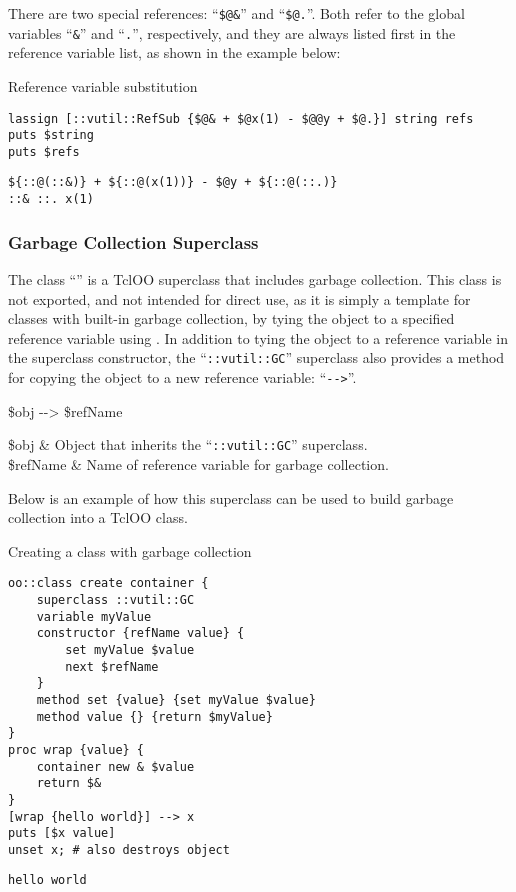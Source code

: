 \documentclass{article}
\begin{document}
There are two special references: ``\texttt{\$@\&}'' and ``\texttt{\$@.}''. Both refer to the global variables ``\texttt{\&}'' and ``\texttt{.}'', respectively, and they are always listed first in the reference variable list, as shown in the example below:
\begin{example}{Reference variable substitution}
\begin{lstlisting}
lassign [::vutil::RefSub {$@& + $@x(1) - $@@y + $@.}] string refs
puts $string
puts $refs
\end{lstlisting}
\tcblower
\begin{lstlisting}
${::@(::&)} + ${::@(x(1))} - $@y + ${::@(::.)}
::& ::. x(1)
\end{lstlisting}
\end{example}

\clearpage
\subsubsection{Garbage Collection Superclass}
The class ``\texttt{}'' is a TclOO superclass that includes garbage collection. 
This class is not exported, and not intended for direct use, as it is simply a template for classes with built-in garbage collection, by tying the object to a specified reference variable using .
In addition to tying the object to a reference variable in the superclass constructor, the ``\texttt{::vutil::GC}'' superclass also provides a method for copying the object to a new reference variable: ``\texttt{-{}->}''.
\begin{syntax}
\$obj -{}-> \$refName
\end{syntax}
\begin{args}
\$obj & Object that inherits the ``\texttt{::vutil::GC}'' superclass. \\
\$refName & Name of reference variable for garbage collection.
\end{args}

Below is an example of how this superclass can be used to build garbage collection into a TclOO class. 
\begin{example}{Creating a class with garbage collection}
\begin{lstlisting}
oo::class create container {
    superclass ::vutil::GC
    variable myValue
    constructor {refName value} {
        set myValue $value
        next $refName
    }
    method set {value} {set myValue $value}
    method value {} {return $myValue}
}
proc wrap {value} {
    container new & $value
    return $&
}
[wrap {hello world}] --> x
puts [$x value]
unset x; # also destroys object
\end{lstlisting}
\tcblower
\begin{lstlisting}
hello world
\end{lstlisting}
\end{example}
\clearpage
\end{document}
